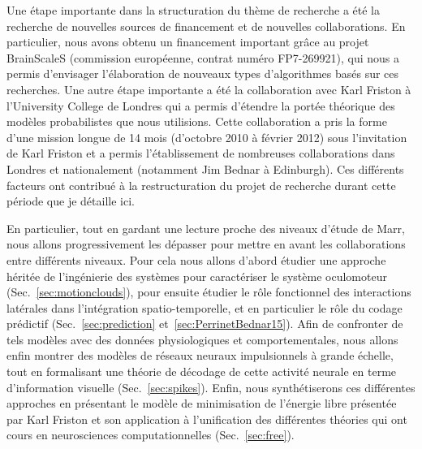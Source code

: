 \documentclass[11pt,french,a4paper,oneside]{article}%
\begin{document}
Une étape importante dans la structuration du thème de recherche a été la recherche de nouvelles sources de financement et de nouvelles collaborations. En particulier, nous avons obtenu un financement important grâce au projet BrainScaleS (commission européenne, contrat numéro FP7-269921), qui nous a permis d'envisager l'élaboration de nouveaux types d'algorithmes basés sur ces recherches. Une autre étape importante a été la collaboration avec Karl Friston à l'University College de Londres qui a permis d'étendre la portée théorique des modèles probabilistes que nous utilisions. Cette collaboration a pris la forme d'une mission longue de 14 mois (d'octobre 2010 à février 2012) sous l'invitation de Karl Friston et a permis l'établissement de nombreuses collaborations dans Londres et nationalement (notamment Jim Bednar à Edinburgh). Ces différents facteurs ont contribué à la restructuration du projet de recherche durant cette période que je détaille ici.%

En particulier, tout en gardant une lecture proche des niveaux d'étude de Marr, nous allons progressivement les dépasser pour mettre en avant les collaborations entre différents niveaux. Pour cela nous allons d'abord étudier une approche héritée de l'ingénierie des systèmes pour caractériser le système oculomoteur (Sec.~\ref{sec:motionclouds}), pour ensuite étudier le rôle fonctionnel des interactions latérales dans l'intégration spatio-temporelle, et en particulier le rôle du codage prédictif (Sec.~\ref{sec:prediction} et~\ref{sec:PerrinetBednar15}). Afin de confronter de tels modèles avec des données physiologiques et comportementales, nous allons enfin montrer des modèles de réseaux neuraux impulsionnels à grande échelle, tout en formalisant une théorie de décodage de cette activité neurale en terme d'information visuelle (Sec.~\ref{sec:spikes}). Enfin, nous synthétiserons ces différentes approches en présentant le modèle de minimisation de l'énergie libre présentée par Karl Friston et son application à l'unification des différentes théories qui ont cours en neurosciences computationnelles (Sec.~\ref{sec:free}).
\end{document}

